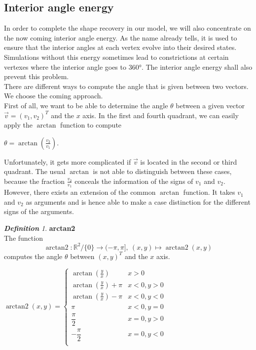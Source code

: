 \documentclass[a4paper,12pt,leqno]{article}
\theoremstyle{plain}
\theoremstyle{remark}
\newtheorem{definition}[theorem]{\bf Definition}
\newcommand{\R}{\mathbb{R}}
\DeclareMathOperator{\atanxy}{arctan2}
\begin{document}
\subsection{Interior angle energy}
In order to complete the shape recovery in our model, we will also concentrate on the now coming interior angle energy. As the name already tells, it is used to ensure that the interior angles at each vertex evolve into their desired states. Simulations without this energy sometimes lead to constrictions at certain vertexes where the interior angle goes to 360°. The interior angle energy shall also prevent this problem.\\
There are different ways to compute the angle that is given between two vectors. We choose the coming approach. \\
First of all, we want to be able to determine the angle $\theta$ between a given vector $\vec{v} = (v_1, v_2)^T$ and the $x$ axis. In the first and fourth quadrant, we can easily apply the $\arctan$ function to compute
\begin{center}
	$\theta = \arctan(\frac{v_2}{v_1})$. 
\end{center}
Unfortunately, it gets more complicated if $\vec{v}$ is located in the second or third quadrant. The usual $\arctan$ is not able to distinguish between these cases, because the fraction $\frac{v_2}{v_1}$ conceals the information of the signs of $v_1$ and $v_2$. However, there exists an extension of the common $\arctan$ function. It takes $v_1$ and $v_2$ as arguments and is hence able to make a case distinction for the different signs of the arguments. \\
\begin{definition} \textbf{arctan2} \\
	The function $$\atanxy:\R^2/\{0\} \rightarrow (-\pi, \pi],\: (x,y) \mapsto \atanxy(x,y)$$ computes the angle $\theta$ between $(x,y)^T$ and the $x$ axis. 
	\begin{center}
		$ \atanxy(x,y) = 
		\begin{cases}
			\arctan(\frac{y}{x}) & x > 0 \\
			\arctan(\frac{y}{x}) + \pi & x < 0, y > 0 \\
			\arctan(\frac{y}{x}) - \pi & x < 0, y < 0 \\
			\pi & x < 0, y = 0 \\
			\dfrac{\pi}{2} & x = 0, y > 0 \\ 		
			- \dfrac{\pi}{2} & x = 0, y < 0 \\ 
		\end{cases} $
	\end{center}
\end{definition}
\end{document}
